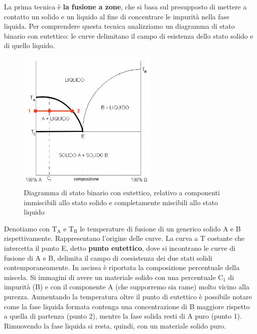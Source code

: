 La prima tecnica è \textbf{la fusione a zone}, che si basa sul presupposto di mettere a contatto un solido e un liquido al fine di concentrare le impurità nella fase liquida. Per comprendere questa tecnica analizziamo un diagramma di stato binario con eutettico: le curve delimitano il campo di esistenza dello stato solido e di quello liquido.
\begin{figure}[!hbt]
	\includegraphics[width=0.6\textwidth]{images/img2.png}
	\caption[Diagramma di stato binario con eutettico]{Diagramma di stato binario con eutettico, relativo a componenti immiscibili allo stato solido e completamente miscibili allo stato liquido}
\end{figure}
Denotiamo con $\mathrm{T_A}$ e $\mathrm{T_B}$ le temperature di fusione di un generico solido A e B rispettivamente. Rappresentano l'origine delle curve. La curva a T costante che intercetta il punto E, detto \textbf{punto eutettico}, dove si incontrano le curve di fusione di A e B, delimita il campo di coesistenza dei due stati solidi contemporaneamente. \newline
In ascissa è riportata la composizione percentuale della miscela.\newline
Si immagini di avere un materiale solido con una percentuale $\mathrm{C_1}$ di impurità (B) e con il componente A (che supporremo sia rame) molto vicino alla purezza. Aumentando la temperatura oltre il punto di eutettico è possibile notare come la fase liquida formata contenga una concentrazione di B maggiore rispetto a quella di partenza (punto 2), mentre la fase solida resti di A puro (punto 1). Rimuovendo la fase liquida si resta, quindi, con un materiale solido puro.

